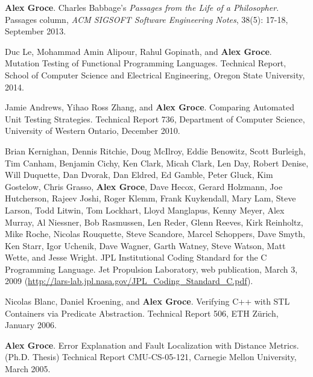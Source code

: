 \documentclass[ComputerScience]{vita}
\begin{document}
\begin{vita}
\begin{Columns, Book Reviews, and Magazine Articles}
\item {\bf Alex Groce}.
\newblock Charles Babbage's \emph{Passages from the Life of a Philosopher}.
\newblock Passages column, \emph{ACM SIGSOFT Software Engineering Notes}, 38(5): 17-18, September 2013.
\end{Columns, Book Reviews, and Magazine Articles}

\begin{Technical Reports}
\item
Duc Le, Mohammad Amin Alipour, Rahul Gopinath, and {\bf Alex Groce}.
\newblock Mutation Testing of Functional Programming Languages.
\newblock Technical Report, School of Computer Science and Electrical Engineering, Oregon State University, 2014.

\item
Jamie Andrews, Yihao Ross Zhang, and {\bf Alex Groce}.
\newblock Comparing Automated Unit Testing Strategies.
\newblock Technical Report 736, Department of Computer Science, University of Western Ontario, December 2010.

\item
Brian Kernighan, Dennis Ritchie, Doug McIlroy, Eddie Benowitz, Scott Burleigh, Tim Canham, Benjamin Cichy, Ken Clark, Micah Clark, Len Day, Robert Denise, Will Duquette, Dan Dvorak, Dan Eldred, Ed Gamble, Peter Gluck, Kim Gostelow, Chris Grasso, {\bf Alex Groce}, Dave Hecox, Gerard Holzmann, Joe Hutcherson, Rajeev Joshi, Roger Klemm, Frank Kuykendall, Mary Lam, Steve Larson, Todd Litwin, Tom Lockhart, Lloyd Manglapus, Kenny Meyer, Alex Murray, Al Niessner, Bob Rasmussen, Len Reder, Glenn Reeves, Kirk Reinholtz, Mike Roche, Nicolas Rouquette, Steve Scandore, Marcel Schoppers, Dave Smyth, Ken Starr, Igor Uchenik, Dave Wagner, Garth Watney, Steve Watson, Matt Wette, and Jesse Wright.
\newblock JPL Institutional Coding Standard for the C Programming Language.
\newblock Jet Propulsion Laboratory, web publication, March 3, 2009 (\url{http://lars-lab.jpl.nasa.gov/JPL\_Coding\_Standard\_C.pdf}).

\item
Nicolas Blanc, Daniel Kroening, and {\bf Alex Groce}.
\newblock Verifying C++ with STL Containers via Predicate Abstraction.
\newblock Technical Report 506, ETH Z\"urich, January 2006.

\item
{\bf Alex Groce}.
\newblock Error Explanation and Fault Localization with Distance Metrics.
\newblock (Ph.D. Thesis) Technical Report CMU-CS-05-121, Carnegie Mellon University, March 2005.


\end{Technical Reports}
\end{vita}
\end{document}

